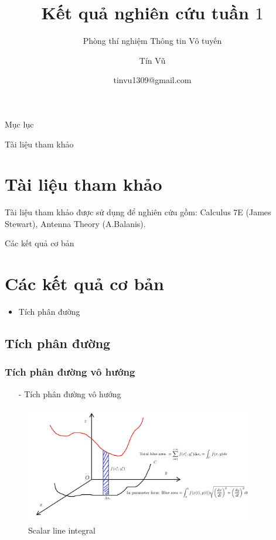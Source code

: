 \documentclass[8pt]{beamer}
\title[Kết quả nghiên cứu tuần 1]
{Kết quả nghiên cứu tuần $1$}
\subtitle{Phòng thí nghiệm Thông tin Vô tuyến}
\author[Phòng thí nghiệm thông tin Vô tuyến]
{Tín Vũ}
\date[VLC 2021] %
{tinvu1309@gmail.com}
\begin{document}
\frame{\titlepage}
\begin{frame}{Mục lục}
\tableofcontents
\end{frame}
\begin{frame}{Tài liệu tham khảo}
\section{Tài liệu tham khảo}
Tài liệu tham khảo được sử dụng để nghiên cứu gồm: Calculus 7E (James Stewart), Antenna Theory (A.Balanis).
\end{frame}
\begin{frame}{Các kết quả cơ bản}
\section{Các kết quả cơ bản}
\begin{itemize}
\item Tích phân đường
\end{itemize}
\subsection{Tích phân đường}
\subsubsection{Tích phân đường vô hướng}
\begin{itemize}
	\item[-] Tích phân đường vô hướng
\end{itemize}
\begin{figure}[h]
			\includegraphics[width=0.9\textwidth]{line.jpg}
			\caption{Scalar line integral}			\label{fig:re1}
\end{figure}
\end{frame}
\end{document}
